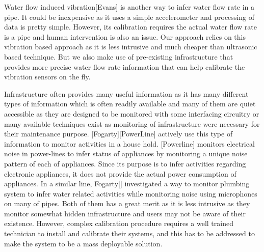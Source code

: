 Water flow induced vibration[Evans] is another way to infer water flow rate in a pipe. It could be inexpensive as it uses a simple accelerometer and processing of data is pretty simple. However, its calibration requires the actual water flow rate is a pipe and human intervention is also an issue. Our approach relies on this vibration based approach as it is less intrusive and much cheaper than ultrasonic based technique. But we also make use of pre-existing infrastructure that provides more precise water flow rate information that can help calibrate the vibration sensors on the fly. 

Infrastructure often provides many useful information as it has many different types of information which is often readily available and many of them are quiet accessible as they are designed to be monitored with some interfacing circuitry or many available techniques exist as monitoring of infrastructure were necessary for their maintenance purpose. [Fogarty][PowerLine] actively use this type of information to monitor activities in a house hold. [Powerline] monitors electrical noise in power-lines to infer status of appliances by monitoring a unique noise pattern of each of appliances. Since its purpose is to infer activities regarding electronic appliances, it does not provide the actual power consumption of appliances. In a similar line, Fogarty[] investigated a way to monitor plumbing system to infer water related activities while monitoring noise using microphones on many of pipes. Both of them has a great merit as it is less intrusive as they monitor somewhat hidden infrastructure and users may not be aware of their existence. However, complex calibration procedure requires a well trained technician to install and calibrate their systems, and this has to be addressed to make the system to be a mass deployable solution.
